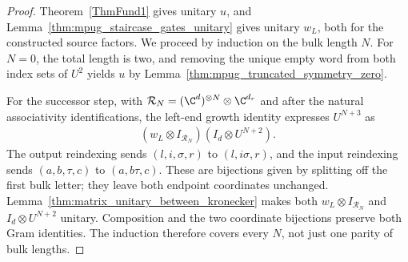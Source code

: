 \begin{proof}\leanok
    Theorem~\ref{ThmFund1} gives unitary $u$, and
    Lemma~\ref{thm:mpug_staircase_gates_unitary} gives unitary $w_L$,
    both for the constructed source factors. We proceed by induction on
    the bulk length $N$. For $N=0$, the total length is two, and
    removing the unique empty word from both index sets of $U^2$ yields
    $u$ by Lemma~\ref{thm:mpug_truncated_symmetry_zero}.

    For the successor step, with
    $\mathcal R_N=(\C^d)^{\otimes N}\otimes\C^{d_r}$ and after the natural
    associativity identifications, the left-end growth identity expresses
    $U^{N+3}$ as
    \begin{align}
        (w_L\otimes I_{\mathcal R_N})(I_d\otimes U^{N+2}).
    \end{align}
    The output reindexing sends $(l,i,\sigma,r)$ to $(l,i\sigma,r)$,
    and the input reindexing sends $(a,b,\tau,c)$ to $(a,b\tau,c)$.
    These are bijections given by splitting off the first bulk letter;
    they leave both endpoint coordinates unchanged.
    Lemma~\ref{thm:matrix_unitary_between_kronecker} makes both
    $w_L\otimes I_{\mathcal R_N}$ and $I_d\otimes U^{N+2}$ unitary.
    Composition and the two coordinate bijections preserve both Gram
    identities. The induction therefore covers every $N$, not just
    one parity of bulk lengths.
\end{proof}

